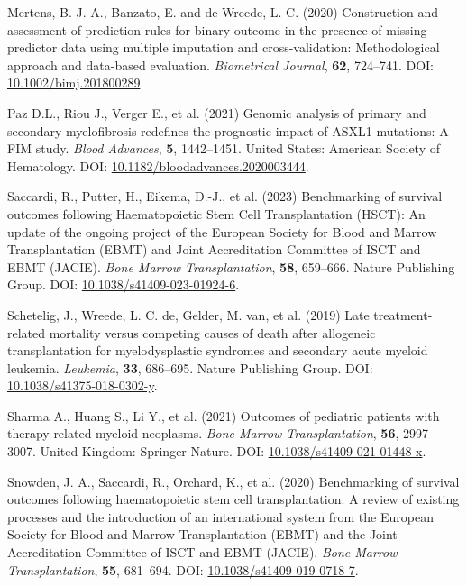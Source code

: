 \documentclass[
  letterpaper,
  DIV=11,
  numbers=noendperiod]{scrreprt}
\newlength{\cslhangindent}
\newlength{\cslentryspacingunit} %
\newenvironment{CSLReferences}[2] %
 {%
  \setlength{\parindent}{0pt}
  \ifodd #1
  \let\oldpar\par
  \def\par{\hangindent=\cslhangindent\oldpar}
  \fi
  \setlength{\parskip}{#2\cslentryspacingunit}
 }%
 {}
\begin{document}
\begin{CSLReferences}{1}{0}
\leavevmode{}%
Mertens, B. J. A., Banzato, E. and de Wreede, L. C. (2020) Construction
and assessment of prediction rules for binary outcome in the presence of
missing predictor data using multiple imputation and cross-validation:
{Methodological} approach and data-based evaluation. \emph{Biometrical
Journal}, \textbf{62}, 724--741. DOI:
\href{https://doi.org/10.1002/bimj.201800289}{10.1002/bimj.201800289}.

\leavevmode{}%
Paz D.L., Riou J., Verger E., et al. (2021) Genomic analysis of primary
and secondary myelofibrosis redefines the prognostic impact of {ASXL1}
mutations: {A FIM} study. \emph{Blood Advances}, \textbf{5}, 1442--1451.
United States: American Society of Hematology. DOI:
\href{https://doi.org/10.1182/bloodadvances.2020003444}{10.1182/bloodadvances.2020003444}.

\leavevmode{}%
Saccardi, R., Putter, H., Eikema, D.-J., et al. (2023) Benchmarking of
survival outcomes following {Haematopoietic Stem Cell Transplantation}
({HSCT}): An update of the ongoing project of the {European Society} for
{Blood} and {Marrow Transplantation} ({EBMT}) and {Joint Accreditation
Committee} of {ISCT} and {EBMT} ({JACIE}). \emph{Bone Marrow
Transplantation}, \textbf{58}, 659--666. Nature Publishing Group. DOI:
\href{https://doi.org/10.1038/s41409-023-01924-6}{10.1038/s41409-023-01924-6}.

\leavevmode{}%
Schetelig, J., Wreede, L. C. de, Gelder, M. van, et al. (2019) Late
treatment-related mortality versus competing causes of death after
allogeneic transplantation for myelodysplastic syndromes and secondary
acute myeloid leukemia. \emph{Leukemia}, \textbf{33}, 686--695. Nature
Publishing Group. DOI:
\href{https://doi.org/10.1038/s41375-018-0302-y}{10.1038/s41375-018-0302-y}.

\leavevmode{}%
Sharma A., Huang S., Li Y., et al. (2021) Outcomes of pediatric patients
with therapy-related myeloid neoplasms. \emph{Bone Marrow
Transplantation}, \textbf{56}, 2997--3007. United Kingdom: Springer
Nature. DOI:
\href{https://doi.org/10.1038/s41409-021-01448-x}{10.1038/s41409-021-01448-x}.

\leavevmode{}%
Snowden, J. A., Saccardi, R., Orchard, K., et al. (2020) Benchmarking of
survival outcomes following haematopoietic stem cell transplantation:
{A} review of existing processes and the introduction of an
international system from the {European Society} for {Blood} and {Marrow
Transplantation} ({EBMT}) and the {Joint Accreditation Committee} of
{ISCT} and {EBMT} ({JACIE}). \emph{Bone Marrow Transplantation},
\textbf{55}, 681--694. DOI:
\href{https://doi.org/10.1038/s41409-019-0718-7}{10.1038/s41409-019-0718-7}.


\end{CSLReferences}
\end{document}

